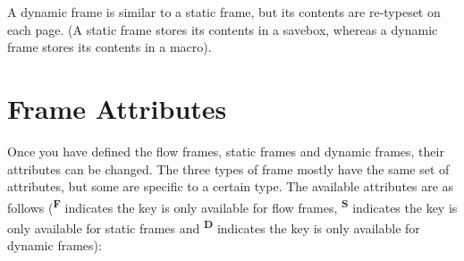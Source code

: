 \documentclass[a0]{a0poster}
\begin{document}
A dynamic frame is similar to a static frame, but its contents
are re-typeset on each page. (A static frame stores its 
contents in a savebox, whereas a dynamic frame stores its
contents in a macro).

\section{Frame Attributes}
\label{sec:modattr}

Once you have defined the {flow frames}, {static frames} and 
{dynamic frames}, their attributes can be changed. 
The three types of frame mostly have the 
same set of attributes, but some are specific to a certain type.
The available attributes are as follows
(\textsuperscript{\textbf{F}} indicates the key is
only available for {flow frames}, 
\textsuperscript{\textbf{S}} indicates the key is only available 
for {static frames}
and \textsuperscript{\textbf{D}} indicates the key
is only available for {dynamic frames}):
\end{document}
